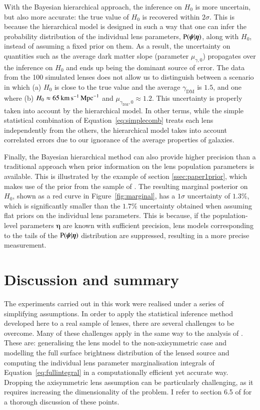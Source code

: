 \documentclass{aa}
\def\gammadm{\gamma_{\mathrm{DM}}}
\def\hyperpars{\boldsymbol{\eta}}
\def\indpar{\boldsymbol{\psi}}
\def\Fref#1{Figure~\ref{#1}\xspace}
\def\Eref#1{Equation~\ref{#1}\xspace}
\def\pr{{\rm P}}
\begin{document}
With the Bayesian hierarchical approach, the inference on $H_0$ is more uncertain, but also more accurate: the true value of $H_0$ is recovered within $2\sigma$.
This is because the hierarchical model is designed in such a way that one can infer the probability distribution of the individual lens parameters, $\pr(\indpar|\hyperpars)$, along with $H_0$, instead of assuming a fixed prior on them. As a result, the uncertainty on quantities such as the average dark matter slope (parameter $\mu_{\gamma,0}$) propagates over the inference on $H_0$ and ends up being the dominant source of error.
The data from the  100 simulated lenses does not allow us to distinguish between a scenario in which (a) $H_0$ is close to the true value and the average $\gammadm$ is $1.5$, and one where (b) $H_0\approx65\,\rm{km}\,\rm{s}^{-1}\,\rm{Mpc}^{-1}$ and $\mu_{\gammadm,0}\approx1.2$. This uncertainty is properly taken into account by the hierarchical model.
In other terms, while the simple statistical combination of \Eref{eq:simplecomb} treats each lens independently from the others, the hierarchical model takes into account correlated errors due to our ignorance of the average properties of galaxies.

Finally, the Bayesian hierarchical method can also provide higher precision than a traditional approach when prior information on the lens population parameters is available. 
This is illustrated by the example of section \ref{ssec:paper1prior}, which makes use of the prior from the sample of .
The resulting marginal posterior on $H_0$, shown as a red curve in \Fref{fig:marginal}, has a $1\sigma$ uncertainty of $1.3\%$, which is significantly smaller than the $1.7\%$ uncertainty obtained when assuming flat priors on the individual lens parameters.
This is because, if the population-level parameters $\hyperpars$ are known with sufficient precision, lens models corresponding to the tails of the $\pr(\indpar|\hyperpars)$ distribution are suppressed, resulting in a more precise measurement.


\section{Discussion and summary}\label{sect:discuss}

The experiments carried out in this work were realised under a series of simplifying assumptions.
In order to apply the statistical inference method developed here to a real sample of lenses, there are several challenges to be overcome. 
Many of these challenges apply in the same way to the analysis of . These are: generalising the lens model to the non-axisymmetric case and modelling the full surface brightness distribution of the lensed source and computing the individual lens parameter marginalisation integrals of \Eref{eq:fullintegral} in a computationally efficient yet accurate way.
Dropping the axisymmetric lens assumption can be particularly challenging, as it requires increasing the dimensionality of the problem.
I refer to section 6.5 of  for a thorough discussion of these points.
\end{document}
